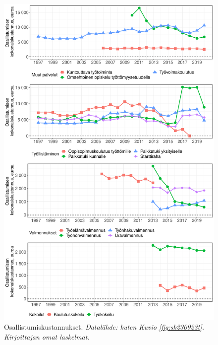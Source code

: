 \documentclass[12pt]{article}
\newcommand{\captionselite}[1] {\textit{\footnotesize{#1}}}
\begin{document}
\begin{figure}[b]
\centering
\includegraphics[scale = 0.6]{../plots/costs/participation_costs.pdf}
\caption{Osallistumiskustannukset. \captionselite{Datalähde: kuten Kuvio \ref{fig:sk230923t}. Kirjoittajan omat laskelmat.}}
   \label{fig:sk230wd}
\end{figure}
\end{document}
